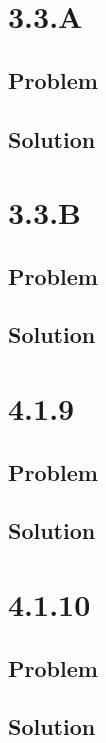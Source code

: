 \documentclass[12pt]{article}
\begin{document}
\section*{3.3.A}

\subsection*{Problem}

\subsection*{Solution}



\section*{3.3.B}

\subsection*{Problem}

\subsection*{Solution}



\section*{4.1.9}

\subsection*{Problem}

\subsection*{Solution}



\section*{4.1.10}

\subsection*{Problem}

\subsection*{Solution}
\end{document}
